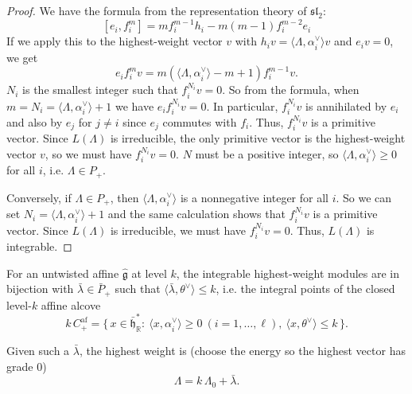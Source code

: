 \documentclass[12pt]{article}
\begin{document}
\begin{proof}
    We have the formula from the representation theory of $\mathfrak{sl}_2$:
    \[[e_i, f_i^{m}] = m f_i^{m-1} h_i - m(m-1) f_i^{m-2} e_i\]
    If we apply this to the highest-weight vector $v$ with $h_i v = \langle \Lambda, \alpha_i^\vee\rangle v$ and $e_i v = 0$, we get
    \[
        e_i f_i^{m} v = m (\langle \Lambda, \alpha_i^\vee\rangle - m + 1) f_i^{m-1} v.
    \]
    $N_i$ is the smallest integer such that $f_i^{N_i} v = 0$. So from the formula, when $m=N_i=\langle\Lambda,\alpha_i^\vee\rangle+1$ we have $e_i f_i^{N_i} v = 0$. In particular, $f_i^{N_i} v$ is annihilated by $e_i$ and also by $e_j$ for $j\neq i$ since $e_j$ commutes with $f_i$. Thus, $f_i^{N_i} v$ is a primitive vector. Since $L(\Lambda)$ is irreducible, the only primitive vector is the highest-weight vector $v$, so we must have $f_i^{N_i} v = 0$. $N$ must be a positive integer, so $\langle\Lambda,\alpha_i^\vee\rangle\geq 0$ for all $i$, i.e. $\Lambda\in P_+$.

    Conversely, if $\Lambda\in P_+$, then $\langle\Lambda,\alpha_i^\vee\rangle$ is a nonnegative integer for all $i$. So we can set $N_i = \langle\Lambda,\alpha_i^\vee\rangle + 1$ and the same calculation shows that $f_i^{N_i} v$ is a primitive vector. Since $L(\Lambda)$ is irreducible, we must have $f_i^{N_i} v = 0$. Thus, $L(\Lambda)$ is integrable.
\end{proof}

\begin{corollary}
    For an untwisted affine $\widehat{\mathfrak g}$ at level $k$, the integrable highest-weight modules are in bijection with $\bar\lambda\in \bar P_+$ such that $\langle \bar\lambda,\theta^\vee\rangle \le k$, i.e. the integral points of the closed level-$k$ affine alcove
    \[k\,C^{\text{af}}_+ = \{\,x\in \bar{\mathfrak h}^*_\mathbb{R}:\ \langle x,\alpha_i^\vee\rangle\ge0\ (i=1,\dots,\ell),\ \langle x,\theta^\vee\rangle\le k\,\}.\]

    Given such a $\bar\lambda$, the highest weight is (choose the energy so the highest vector has grade 0)
    \[\Lambda = k\,\Lambda_0 + \bar\lambda.\]
\end{corollary}
\end{document}
